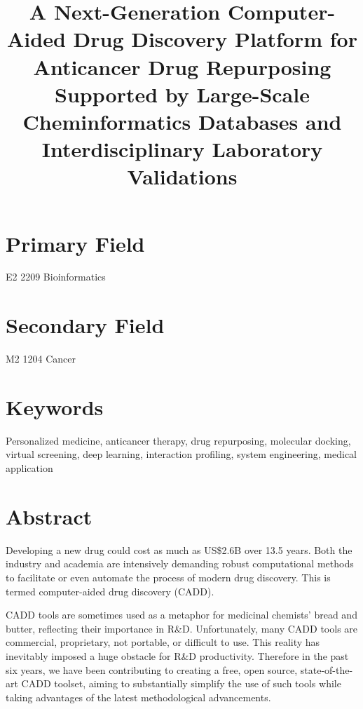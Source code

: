 \documentclass[a4paper,12pt]{article}
\begin{document}
\title{A Next-­Generation Computer­-Aided Drug Discovery Platform for Anticancer Drug Repurposing Supported by Large-­Scale Cheminformatics Databases and Interdisciplinary Laboratory Validations}
\maketitle

\section*{Primary Field}

E2 2209 Bioinformatics

\section*{Secondary Field}

M2 1204 Cancer

\section*{Keywords}

Personalized medicine, anticancer therapy, drug repurposing, molecular docking, virtual screening, deep learning, interaction profiling, system engineering, medical application

\section*{Abstract}

Developing a new drug could cost as much as US\$2.6B over 13.5 years. Both the industry and academia are intensively demanding robust computational methods to facilitate or even automate the process of modern drug discovery. This is termed computer-aided drug discovery (CADD).

CADD tools are sometimes used as a metaphor for medicinal chemists' bread and butter, reflecting their importance in R\&D. Unfortunately, many CADD tools are commercial, proprietary, not portable, or difficult to use. This reality has inevitably imposed a huge obstacle for R\&D productivity. Therefore in the past six years, we have been contributing to creating a free, open source, state-of-the-art CADD toolset, aiming to substantially simplify the use of such tools while taking advantages of the latest methodological advancements.
\end{document}

